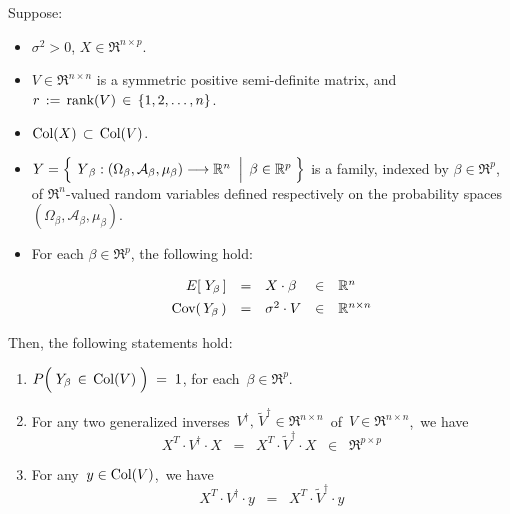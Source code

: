 \begin{theorem}
\mbox{}
\vskip 0.1cm
\noindent
Suppose:
\begin{itemize}
\item
	$\sigma^{2} > 0$,
	$X \in \Re^{n \times p}$.
\item
	$V \in \Re^{n \times n}$ is a symmetric positive semi-definite matrix, and
	\,$r \,:=\, \textnormal{rank}(V) \,\in\, \{1,2,\ldots,n\}$.
\item
	{\color{red}$\textnormal{Col}(X) \,\subset\, \textnormal{Col}(V)$}.
\item
	$Y = \left\{\;
		\left.
		\overset{{\color{white}.}}{Y}_{\beta} : (\Omega_{\beta},\mathcal{A}_{\beta},\mu_{\beta}) \longrightarrow \Re^{n}
		\;\;\right\vert\;
		\beta \in \Re^{p}
		\;\right\}$
	is a family, indexed by $\beta \in \Re^{p}$,
	of $\Re^{n}$-valued random variables defined respectively on the
	probability spaces $(\Omega_{\beta},\mathcal{A}_{\beta},\mu_{\beta})$.
\item
	For each $\beta \in \Re^{p}$, the following hold:
	\begin{equation*}
	\begin{array}{rclcl}
	E\!\left[\;Y_{\beta}\,\right] &  \overset{{\color{white}\vert}}{=} & X \cdot \beta & \in & \Re^{n}
	\\
	\Cov\!\left(\,Y_{\beta}\,\right) & \overset{{\color{white}\vert}}{=} & \sigma^{2} \cdot V & \in & \Re^{n \times n}
	\end{array}
	\end{equation*}
\end{itemize}
Then, the following statements hold:
\begin{enumerate}
\item\label{PYinColVEqOne}
	$P\!\left(\;Y_{\beta} \,\overset{{\color{white}.}}{\in}\, \Col(V)\;\right) \; = \; 1$,\;
	for each \,$\beta \in \Re^{p}$.
\item\label{XtVdaggerX}
	For any two generalized inverses
	\,$V^{\dagger},\, \widetilde{V}^{\dagger} \in \Re^{n \times n}$\,
	of \,$V \in \Re^{n \times n}$,\, we have
	\begin{equation*}
	X^{T} \cdot V^{\dagger} \cdot X
	\;\; = \;\;
	X^{T} \cdot \widetilde{V}^{\dagger} \cdot X
	\;\; \in \;\; \Re^{p \times p}
	\end{equation*}
\item\label{XtVdaggerY}
	For any \,$y \in \textnormal{Col}(V)$,\, we have
	\begin{equation*}
	X^{T} \cdot V^{\dagger} \cdot y
	\;\; = \;\;
	X^{T} \cdot \widetilde{V}^{\dagger} \cdot y

\end{equation*}
\end{enumerate}
\end{theorem}
